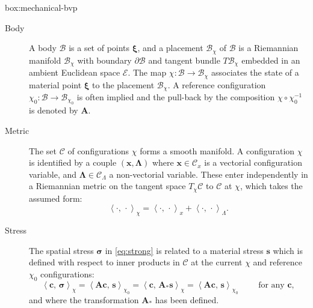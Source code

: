 \begin{ambox}{box:mechanical-bvp}
{
\begin{description}
\item[Body]
A body \(\mathcal{B}\) is a set of points \(\boldsymbol{\xi}\), and a placement
\(\mathcal{B}_\chi\) of \(\mathcal{B}\) is a Riemannian manifold
\(\mathcal{B}_\chi\) with boundary \(\partial \mathcal{B}\) and tangent
bundle \(T\mathcal{B}_\chi\) embedded in an ambient Euclidean space
\(\mathcal{E}\). The map
\(\chi\colon \mathcal{B}\rightarrow \mathcal{B}_\chi\) associates the
state of a material point \(\boldsymbol{\xi}\) to the placement
\(\mathcal{B}_\chi\). A reference configuration
\(\chi_0\colon \mathcal{B}\rightarrow \mathcal{B}_{\chi_0}\) is often
implied and the pull-back by the composition \(\chi\circ\chi_0^{-1}\) is
denoted by \(\boldsymbol{A}\).
\item[Metric]
The set \(\mathscr{C}\) of configurations \(\chi\) forms a smooth
 manifold. A configuration \(\chi\) is identified by a couple
\((\boldsymbol{x}, \boldsymbol{\Lambda})\) where \(\boldsymbol{x}\in\mathscr{C}_x\) is a
vectorial configuration variable, and
\(\boldsymbol{\Lambda}\in\mathscr{C}_{\scriptscriptstyle{\Lambda}}\) a
non-vectorial variable. These enter independently in a Riemannian metric
on the tangent space \(T_\chi\mathscr{C}\) to \(\mathscr{C}\) at
\(\chi\), which takes the assumed form: 
\begin{equation}
  \left< \cdot , \, \cdot\right>_{\chi} = \left< \cdot , \, \cdot\right>_{x} + \left< \cdot , \, \cdot\right>_{\scriptscriptstyle{\Lambda}} .
  \label{eq:conf-pair}
\end{equation}
%
\item[Stress]
The spatial stress \(\boldsymbol{\sigma}\) in \eqref{eq:strong} is related to a
material stress \(\boldsymbol{s}\) which is defined with respect to inner products 
in \(\mathscr{C}\) at the current \(\chi\) and reference
\(\chi_0\) configurations:
\begin{equation}
  \left<\boldsymbol{c},\, \boldsymbol{\sigma}\right>_{\chi}
  =\left< \boldsymbol{A}\boldsymbol{c},\, \boldsymbol{s}\right>_{\chi_0}
  = \left<\boldsymbol{c},\, \boldsymbol{A}_*\boldsymbol{s}\right>_{\chi}
  =\left< \boldsymbol{A}\boldsymbol{c},\, \boldsymbol{s}\right>_{\chi_0}\qquad\text{ for any }\boldsymbol{c},
  \label{eq:def-Astar}
\end{equation}
and where the transformation \(\boldsymbol{A}_*\) has been defined.

\end{description}}
\end{ambox}
